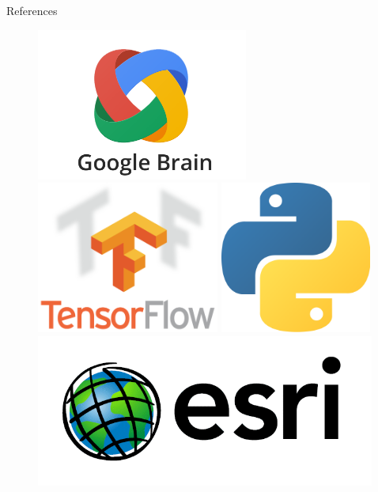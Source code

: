 \documentclass[22pt]{beamer}
\begin{document}
\begin{frame}[fragile]
\begin{textblock}{3.5}
\begin{block}{References}

{\scriptsize
}
\end{block}

\begin{figure}[htbp]
\centering
\includegraphics[height=5cm]{googlebrain-logo.png}
\hspace{1cm}
\includegraphics[height=5cm]{tensorflow-logo.png}
\hspace{1cm}
\includegraphics[height=5cm]{python-logo.png}
\hspace{1cm}
\includegraphics[height=5cm]{esri-logo.png}
\end{figure}


\end{textblock}
\end{frame}
\end{document}
